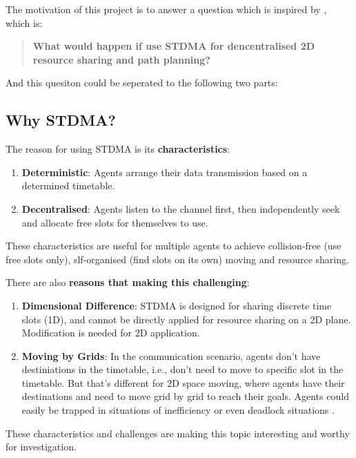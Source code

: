 The motivation of this project is to answer a question which is inspired by \cite{Paper_From_Supervisor}, which is:

\begin{quote}
    \textbf{What would happen if use STDMA for dencentralised 2D resource sharing and path planning?}
\end{quote}

And this quesiton could be seperated to the following two parts:

\subsection{Why STDMA?}

The reason for using STDMA is its \textbf{characteristics}\cite{STDMA_characteristic}:

\begin{enumerate}
    \item \textbf{Deterministic}: Agents arrange their data transmission based on a determined timetable.
    \item \textbf{Decentralised}: Agents listen to the channel first, then independently seek and allocate free slots for themselves to use.
\end{enumerate}

These characteristics are useful for multiple agents to achieve collision-free (use free slots only), slf-organised (find slots on its own) moving and resource sharing.

There are also \textbf{reasons that making this challenging}:
\begin{enumerate}
    \item \textbf{Dimensional Difference}: STDMA is designed for sharing discrete time slots (1D), and cannot be directly applied for resource sharing on a 2D plane. Modification is needed for 2D application.
    \item \textbf{Moving by Grids}: In the communication scenario, agents don't have destiniations in the timetable, i.e., don't need to move to specific slot in the timetable. But that's different for 2D space moving, where agents have their destinations and need to move grid by grid to reach their goals. Agents could easily be trapped in situations of inefficiency or even deadlock situations \cite{MAPF_Deadlock_Explain1,MAPF_Deadlock_Explain2}.   
\end{enumerate}

These characteristics and challenges are making this topic interesting and worthy for investigation.

